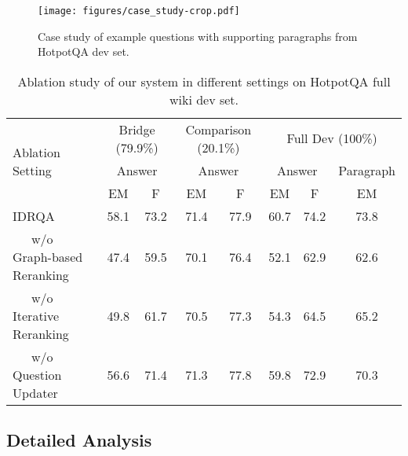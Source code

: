 \documentclass[sigconf]{acmart}
\begin{document}
\begin{figure*}[ht]
\center
\texttt{[image: figures/case\_study-crop.pdf]}
\center
\caption{Case study of example questions with supporting paragraphs from HotpotQA dev set.}
\label{figure:case study}
\end{figure*}






\setlength\tabcolsep{12pt}
\begin{table*}
\centering
\caption{Ablation study of our system in different settings on HotpotQA full wiki dev set.}
\label{table:ablation comparison and bridge}
\begin{tabular}{@{}lccccccc@{}}
\toprule
\multirow{3}{*}{Ablation Setting} & \multicolumn{2}{c}{Bridge (79.9\%)} & \multicolumn{2}{c}{Comparison (20.1\%)} & \multicolumn{3}{c}{Full Dev (100\%)} \\ \cmidrule(l){2-8} 
 & \multicolumn{2}{c}{Answer} & \multicolumn{2}{c}{Answer} & \multicolumn{2}{c}{Answer} & Paragraph \\ \cmidrule(l){2-8} 
 & EM & F & EM & F & EM & F & EM \\ \midrule
IDRQA & 58.1 & 73.2 & 71.4 & 77.9 & 60.7 & 74.2 & 73.8 \\
\ \ \ w/o Graph-based Reranking & 47.4 & 59.5 & 70.1 & 76.4 & 52.1 & 62.9 & 62.6 \\
\ \ \ w/o Iterative Reranking & 49.8 & 61.7 & 70.5 & 77.3 & 54.3 & 64.5 & 65.2 \\
\ \ \ w/o Question Updater & 56.6 & 71.4 & 71.3 & 77.8 & 59.8 & 72.9 & 70.3 \\ \bottomrule
\end{tabular}
\end{table*}






\subsection{Detailed Analysis}
\end{document}
